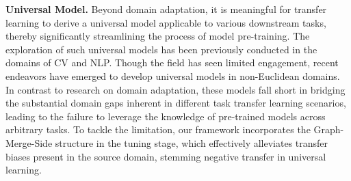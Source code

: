\noindent \textbf{Universal Model.} Beyond domain adaptation, it is meaningful for transfer learning to derive a universal model applicable to various downstream tasks, thereby significantly streamlining the process of model pre-training. The exploration of such universal models has been previously conducted in the domains of CV and NLP\citep{mccann2018natural,yu2019universally,silver2021reward,reed2022generalist}. Though the field has seen limited engagement, recent endeavors have emerged to develop universal models in non-Euclidean domains\citep{sun2023all,jing2023deep}. In contrast to research on domain adaptation, these models fall short in bridging the substantial domain gaps inherent in different task transfer learning scenarios, leading to the failure to leverage the knowledge of pre-trained models across arbitrary tasks. To tackle the limitation, our framework incorporates the Graph-Merge-Side structure in the tuning stage, which effectively alleviates transfer biases present in the source domain, stemming negative transfer in universal learning.
